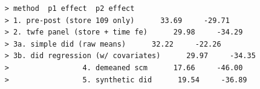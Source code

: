 \documentclass[10pt]{article}
\begin{document}
\begin{verbatim}
    > method  p1 effect  p2 effect
    > 1. pre-post (store 109 only)      33.69     -29.71
    > 2. twfe panel (store + time fe)      29.98     -34.29
    > 3a. simple did (raw means)      32.22     -22.26
    > 3b. did regression (w/ covariates)      29.97     -34.35
    >                 4. demeaned scm      17.66     -46.00
    >                 5. synthetic did      19.54     -36.89
\end{verbatim}
\end{document}
